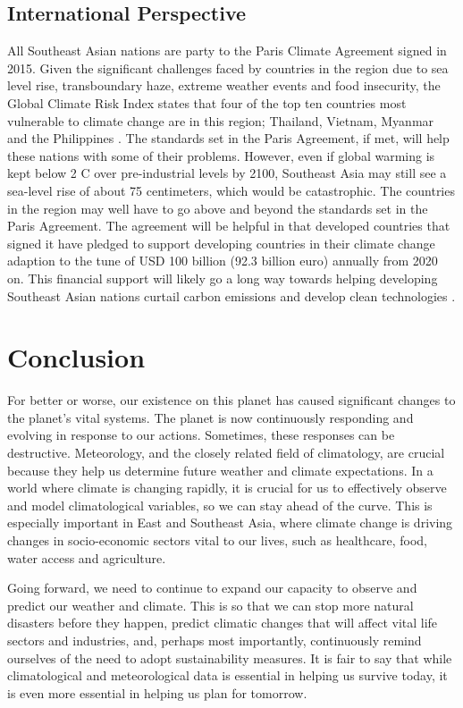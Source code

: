 \subsection{International Perspective}

All Southeast Asian nations are party to the Paris Climate Agreement signed in 2015. Given the significant challenges faced by countries in the region due to sea level rise, transboundary haze, extreme weather events and food insecurity, the Global Climate Risk Index states that four of the top ten countries most vulnerable to climate change are in this region; Thailand, Vietnam, Myanmar and the Philippines \citep{WRIasean}. The standards set in the Paris Agreement, if met, will help these nations with some of their problems. However, even if global warming is kept below 2 \degree C over pre-industrial levels by 2100, Southeast Asia may still see a sea-level rise of about 75 centimeters, which would be catastrophic. The countries in the region may well have to go above and beyond the standards set in the Paris Agreement. The agreement will be helpful in that developed countries that signed it have pledged to support developing countries in their climate change adaption to the tune of USD 100 billion (92.3 billion euro) annually from 2020 on. This financial support will likely go a long way towards helping developing Southeast Asian nations curtail carbon emissions and develop clean technologies \citep{DW2015}. 

\section{Conclusion}

For better or worse, our existence on this planet has caused significant changes to the planet's vital systems. The planet is now continuously responding and evolving in response to our actions. Sometimes, these responses can be destructive. Meteorology, and the closely related field of climatology, are crucial because they help us determine future weather and climate expectations. In a world where climate is changing rapidly, it is crucial for us to effectively observe and model climatological variables, so we can stay ahead of the curve. This is especially important in East and Southeast Asia, where climate change is driving changes in socio-economic sectors vital to our lives, such as healthcare, food, water access and agriculture.
 
Going forward, we need to continue to expand our capacity to observe and predict our weather and climate. This is so that we can stop more natural disasters before they happen, predict climatic changes that will affect vital life sectors and industries, and, perhaps most importantly, continuously remind ourselves of the need to adopt sustainability measures. It is fair to say that while climatological and meteorological data is essential in helping us survive today, it is even more essential in helping us plan for tomorrow. 

